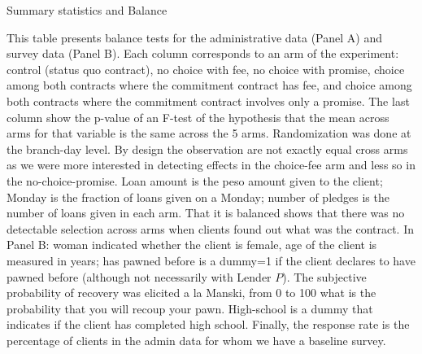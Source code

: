 \documentclass[11pt]{article}
\begin{document}
\begin{table}[H]
\caption{Summary statistics and Balance}
\label{SS}
\begin{center}
\scriptsize{}
\end{center}
 \scriptsize
This table presents balance tests for the administrative data (Panel A) and survey data (Panel B). Each column corresponds to an arm of the experiment: control (status quo contract), no choice with fee, no choice with promise, choice among both contracts where the commitment contract has fee, and choice among both contracts where the commitment contract involves only a promise. The last column show the p-value of an F-test of the hypothesis that the mean across arms for that variable is the same across the 5 arms. Randomization was done at the branch-day level. By design the observation are not exactly equal cross arms as we were more interested in detecting effects in the choice-fee arm and less so in the no-choice-promise. Loan amount is the peso amount given to the client; Monday is the fraction of loans given on a Monday; number of pledges is the number of loans given in each arm. That it is balanced shows that there was no detectable selection across arms when clients found out what was the contract. In Panel B: woman indicated whether the client is female, age of the client is measured in years; has pawned before is a dummy=1 if the client declares to have pawned before (although not necessarily with Lender $P$). The subjective probability of recovery was elicited a la Manski, from 0 to 100 what is the probability that you will recoup your pawn. High-school is a dummy that indicates if the client has completed high school. Finally, the response rate is the percentage of clients in the admin data for whom we have a baseline survey.
\end{table}


\pagebreak
\end{document}
